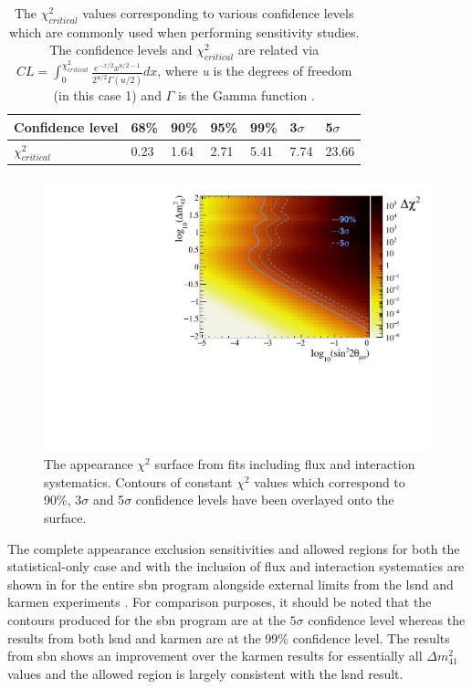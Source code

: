 \begin{table}[h!]
\begin{tabular}{lllllll}
 Confidence level & 68\% & 90\% & 95\% & 99\% & 3$\sigma$ & 5$\sigma$ \\ \hline
$\chi^2_{critical}$ & 0.23 & 1.64 & 2.71 & 5.41 & 7.74 & 23.66
\end{tabular}
\caption[$\chi^2_{critical}$ values for various confidence levels.]{The $\chi^2_{critical}$ values corresponding to various confidence levels which are commonly used when performing sensitivity studies. The confidence levels and $\chi^2_{critical}$ are related via $CL = \int_0^{\chi^2_{critical}} \frac{e^{-x/2}x^{u/2-1}}{2^{u/2}\Gamma(u/2)} dx$, where \textit{u} is the degrees of freedom (in this case 1) and $\Gamma$ is the Gamma function \cite{critical_chi2_book}.}
\label{table:critical_chi2_values}
\end{table}

\begin{figure}[h!]
    \centering
    \includegraphics[width = \largefigwidth]{figures-chap6/exclusion_contours/nue_app_03d1_chi2_surface.pdf}
    \caption[\nue appearance contours overlayed on the $\chi^2$ surface.]{The \nue appearance $\chi^2$ surface from fits including flux and interaction systematics. Contours of constant $\chi^2$ values which correspond to 90\%, 3$\sigma$ and 5$\sigma$ confidence levels have been overlayed onto the surface.}
    \label{fig:nue_app_chisq_surface}
\end{figure}


The complete \nue appearance exclusion sensitivities and allowed regions for both the statistical-only case and with the inclusion of flux and interaction systematics are shown in  for the entire \gls{sbn} program alongside external limits from the \gls{lsnd} and \gls{karmen} experiments \cite{LSND_KARMEN_nue_app_contour}. For comparison purposes, it should be noted that the contours produced for the \gls{sbn} program are at the $5\sigma$ confidence level whereas the results from both \gls{lsnd} and \gls{karmen} are at the 99\% confidence level. The results from \gls{sbn} shows an improvement over the \gls{karmen} results for essentially all $\Delta m^2_{41}$ values and the allowed region is largely consistent with the \gls{lsnd} result. 


